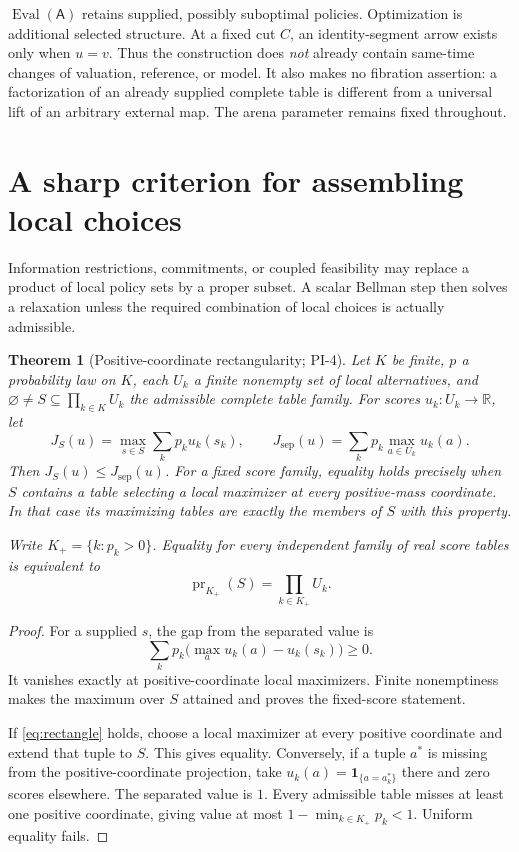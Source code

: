\documentclass[11pt]{article}
\newtheorem{theorem}{Theorem}[section]
\theoremstyle{definition}
\DeclareMathOperator{\pr}{pr}
\newcommand{\R}{\mathbb R}
\newcommand{\A}{\mathsf A}
\newcommand{\Eval}{\operatorname{Eval}}
\begin{document}
\(\Eval(\A)\) retains supplied, possibly suboptimal policies. Optimization
is additional selected structure. At a fixed cut \(C\), an identity-segment
arrow exists only when \(u=v\). Thus the construction does \emph{not} already
contain same-time changes of valuation, reference, or model. It also makes
no fibration assertion: a factorization of an already supplied complete
table is different from a universal lift of an arbitrary external map.
The arena parameter remains fixed throughout.

\section{A sharp criterion for assembling local choices}
\label{sec:rectangle}
Information restrictions, commitments, or coupled feasibility may replace a
product of local policy sets by a proper subset. A scalar Bellman step then
solves a relaxation unless the required combination of local choices is
actually admissible.

\begin{theorem}[Positive-coordinate rectangularity; PI-4]
\label{thm:rectangle}
Let \(K\) be finite, \(p\) a probability law on \(K\), each \(U_k\) a finite
nonempty set of local alternatives, and
\(\varnothing\ne S\subseteq\prod_{k\in K}U_k\) the admissible complete
table family. For scores \(u_k:U_k\to\R\), let
\[
 J_S(u)=\max_{s\in S}\sum_kp_k u_k(s_k),\qquad
 J_{\mathrm{sep}}(u)=\sum_kp_k\max_{a\in U_k}u_k(a).
\]
Then \(J_S(u)\leq J_{\mathrm{sep}}(u)\). For a fixed score family,
equality holds precisely when \(S\) contains a table selecting a local
maximizer at every positive-mass coordinate. In that case its maximizing
tables are exactly the members of \(S\) with this property.

Write \(K_+=\{k:p_k>0\}\). Equality for \emph{every independent family
of real score tables} is equivalent to
\begin{equation}
 \pr_{K_+}(S)=\prod_{k\in K_+}U_k.
 \label{eq:rectangle}
\end{equation}
\end{theorem}
\begin{proof}
For a supplied \(s\), the gap from the separated value is
\[
 \sum_k p_k\bigl(\max_a u_k(a)-u_k(s_k)\bigr)\geq0.
\]
It vanishes exactly at positive-coordinate local maximizers. Finite
nonemptiness makes the maximum over \(S\) attained and proves the
fixed-score statement.

If \eqref{eq:rectangle} holds, choose a local maximizer at every
positive coordinate and extend that tuple to \(S\). This gives equality.
Conversely, if a tuple \(a^*\) is missing from the positive-coordinate
projection, take \(u_k(a)=\mathbf1_{\{a=a^*_k\}}\) there and zero scores
elsewhere. The separated value is \(1\). Every admissible table misses
at least one positive coordinate, giving value at most
\(1-\min_{k\in K_+}p_k<1\). Uniform equality fails.
\end{proof}
\end{document}
